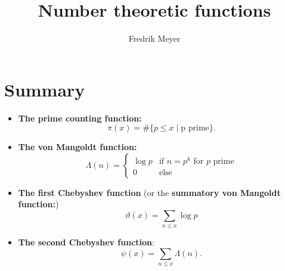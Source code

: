 \documentclass[11pt, english]{article}
\begin{document}
\title{Number theoretic functions}
\author{Fredrik Meyer}
\maketitle 

\section{Summary}

\begin{itemize}
\item \textbf{The prime counting function:}
$$
\pi(x) = \# \{ p \leq x \mid \text{p prime} \}.
$$
\item \textbf{The von Mangoldt function:}
$$
\Lambda(n) = \begin{cases} \log p & \text{if $n=p^k$ for $p$ prime} \\
0 & \text{else}
\end{cases}
$$
\item \textbf{The first Chebyshev function} (or the \textbf{summatory von Mangoldt function:})
$$
\vartheta(x) = \sum_{n \leq x} \log p
$$
\item \textbf{The second Chebyshev function}:
$$
\psi(x) = \sum_{n \leq x} \Lambda(n).
$$

\end{itemize}
\end{document}
